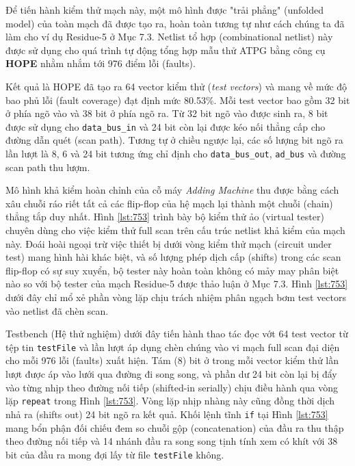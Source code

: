 Để tiến hành kiểm thử mạch này, một mô hình được "trải phẳng" (unfolded model) của toàn mạch đã được tạo ra, hoàn toàn tương tự như cách chúng ta đã làm cho ví dụ Residue-5 ở Mục 7.3. Netlist tổ hợp (combinational netlist) này được sử dụng cho quá trình tự động tổng hợp mẫu thử ATPG bằng công cụ \textbf{HOPE} nhằm nhắm tới 976 điểm lỗi (faults). 

Kết quả là HOPE đã tạo ra 64 vector kiểm thử (\textit{test vectors}) và mang về mức độ bao phủ lỗi (fault coverage) đạt định mức 80.53\%. Mỗi test vector bao gồm 32 bit ở phía ngõ vào và 38 bit ở phía ngõ ra. Từ 32 bit ngõ vào được sinh ra, 8 bit được sử dụng cho \texttt{data\_bus\_in} và 24 bit còn lại được kéo nối thẳng cấp cho đường dẫn quét (scan path). Tương tự ở chiều ngược lại, các số lượng bit ngõ ra lần lượt là 8, 6 và 24 bit tương ứng chỉ định cho \texttt{data\_bus\_out}, \texttt{ad\_bus} và đường scan path thu lượm.

Mô hình khả kiểm hoàn chỉnh của cỗ máy \textit{Adding Machine} thu được bằng cách xâu chuỗi ráo riết tất cả các flip-flop của hệ mạch lại thành một chuỗi (chain) thẳng tắp duy nhất. Hình \ref{lst:753} trình bày bộ kiểm thử ảo (virtual tester) chuyên dùng cho việc kiểm thử full scan trên cấu trúc netlist khả kiểm của mạch này. Đoái hoài ngoại trừ việc thiết bị dưới vòng kiểm thử mạch (circuit under test) mang hình hài khác biệt, và số lượng phép dịch cấp (shifts) trong các scan flip-flop có sự suy xuyển, bộ tester này hoàn toàn không có mảy may phân biệt nào so với bộ tester của mạch Residue-5 được thảo luận ở Mục 7.3. Hình \ref{lst:753} dưới đây chỉ mổ xẻ phần vòng lặp chịu trách nhiệm phân ngạch bơm test vectors vào netlist đã chèn scan.

Testbench (Hệ thử nghiệm) dưới đây tiến hành thao tác đọc vớt 64 test vector từ tệp tin \texttt{testFile} và lần lượt áp dụng chèn chúng vào vi mạch full scan đại diện cho mỗi 976 lỗi (faults) xuất hiện. Tám (8) bit ở trong mỗi vector kiểm thử lần lượt được áp vào lưới qua đường đi song song, và phần dư 24 bit còn lại bị đẩy vào từng nhịp theo đường nối tiếp (shifted-in serially) chịu điều hành qua vòng lặp \texttt{repeat} trong Hình \ref{lst:753}. Vòng lặp nhịp nhàng này cũng đồng thời dịch nhả ra (shifts out) 24 bit ngõ ra kết quả. Khối lệnh tĩnh \texttt{if} tại Hình \ref{lst:753} mang bổn phận đối chiếu đem so chuỗi gộp (concatenation) của đầu ra thu thập theo đường nối tiếp và 14 nhánh đầu ra song song tịnh tính xem có khít với 38 bit của đầu ra mong đợi lấy từ file \texttt{testFile} không.

